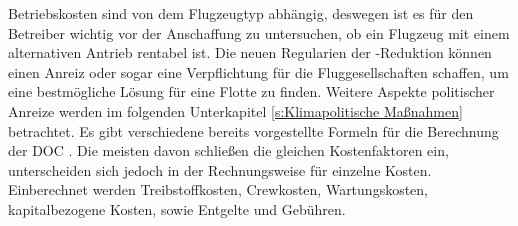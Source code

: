 %
Betriebskosten sind von dem Flugzeugtyp abhängig, deswegen ist es für den Betreiber 
wichtig vor der Anschaffung zu untersuchen, 
ob ein Flugzeug mit einem alternativen Antrieb rentabel ist. 
Die neuen Regularien der -Reduktion können einen Anreiz oder sogar 
eine Verpflichtung für die Fluggesellschaften schaffen, um eine bestmögliche Lösung für eine Flotte zu finden. 
Weitere Aspekte politischer Anreize werden im folgenden Unterkapitel \ref{s:Klimapolitische Maßnahmen} betrachtet.
%
Es gibt verschiedene bereits vorgestellte Formeln für die Berechnung der DOC \cite{scholz_design_evaluation_doc}.
Die meisten davon schließen die gleichen Kostenfaktoren ein, 
unterscheiden sich jedoch in der Rechnungsweise für einzelne Kosten.
Einberechnet werden Treibstoffkosten, Crewkosten, Wartungskosten, kapitalbezogene Kosten, sowie Entgelte und Gebühren.\\

